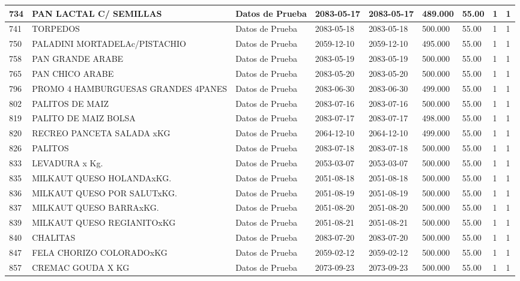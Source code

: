 \documentclass[a4paper,12pt]{article}
\begin{document}
\begin{landscape}
\begin{longtable}{|p{4cm}|p{2.5cm}|p{2.5cm}|p{1.8cm}|p{1.8cm}|p{1cm}|p{1cm}|p{3cm}|p{3cm}||}
734 & PAN LACTAL C/ SEMILLAS & Datos de Prueba & 2083-05-17 & 2083-05-17 & 489.000 & 55.00 & 1 & 1 \\ \hline 
741 & TORPEDOS & Datos de Prueba & 2083-05-18 & 2083-05-18 & 500.000 & 55.00 & 1 & 1 \\ \hline 
750 & PALADINI MORTADELAc/PISTACHIO & Datos de Prueba & 2059-12-10 & 2059-12-10 & 495.000 & 55.00 & 1 & 1 \\ \hline 
758 & PAN GRANDE ARABE & Datos de Prueba & 2083-05-19 & 2083-05-19 & 500.000 & 55.00 & 1 & 1 \\ \hline 
765 & PAN CHICO ARABE & Datos de Prueba & 2083-05-20 & 2083-05-20 & 500.000 & 55.00 & 1 & 1 \\ \hline 
796 & PROMO 4 HAMBURGUESAS GRANDES 4PANES & Datos de Prueba & 2083-06-30 & 2083-06-30 & 499.000 & 55.00 & 1 & 1 \\ \hline 
802 & PALITOS DE MAIZ & Datos de Prueba & 2083-07-16 & 2083-07-16 & 500.000 & 55.00 & 1 & 1 \\ \hline 
819 & PALITO DE MAIZ BOLSA & Datos de Prueba & 2083-07-17 & 2083-07-17 & 498.000 & 55.00 & 1 & 1 \\ \hline 
820 & RECREO PANCETA SALADA xKG & Datos de Prueba & 2064-12-10 & 2064-12-10 & 499.000 & 55.00 & 1 & 1 \\ \hline 
826 & PALITOS & Datos de Prueba & 2083-07-18 & 2083-07-18 & 500.000 & 55.00 & 1 & 1 \\ \hline 
833 & LEVADURA x Kg. & Datos de Prueba & 2053-03-07 & 2053-03-07 & 500.000 & 55.00 & 1 & 1 \\ \hline 
835 & MILKAUT QUESO HOLANDAxKG. & Datos de Prueba & 2051-08-18 & 2051-08-18 & 500.000 & 55.00 & 1 & 1 \\ \hline 
836 & MILKAUT QUESO POR SALUTxKG. & Datos de Prueba & 2051-08-19 & 2051-08-19 & 500.000 & 55.00 & 1 & 1 \\ \hline 
837 & MILKAUT QUESO BARRAxKG. & Datos de Prueba & 2051-08-20 & 2051-08-20 & 500.000 & 55.00 & 1 & 1 \\ \hline 
839 & MILKAUT QUESO REGIANITOxKG & Datos de Prueba & 2051-08-21 & 2051-08-21 & 500.000 & 55.00 & 1 & 1 \\ \hline 
840 & CHALITAS & Datos de Prueba & 2083-07-20 & 2083-07-20 & 500.000 & 55.00 & 1 & 1 \\ \hline 
847 & FELA CHORIZO COLORADOxKG & Datos de Prueba & 2059-02-12 & 2059-02-12 & 500.000 & 55.00 & 1 & 1 \\ \hline 
857 & CREMAC GOUDA X KG & Datos de Prueba & 2073-09-23 & 2073-09-23 & 500.000 & 55.00 & 1 & 1 \\ \hline 

\end{longtable}
\end{landscape}
\end{document}
